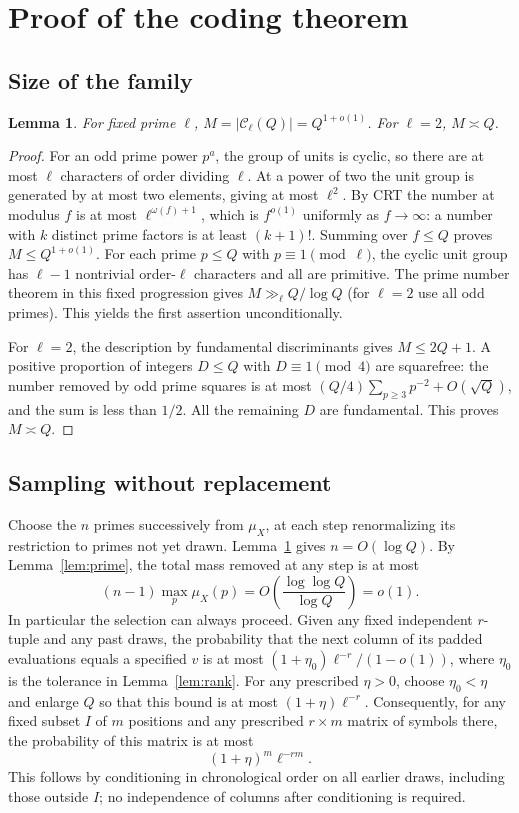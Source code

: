 \documentclass[11pt]{article}
\newtheorem{lemma}[theorem]{Lemma}
\theoremstyle{remark}\newtheorem{remark}[theorem]{Remark}
\newcommand{\C}{\mathcal C}
\newcommand{\abs}[1]{\left|#1\right|}
\begin{document}
\section{Proof of the coding theorem}
\subsection{Size of the family}
\begin{lemma}\label{lem:count}
For fixed prime $\ell$, $M=\abs{\C_\ell(Q)}=Q^{1+o(1)}$. For $\ell=2$, $M\asymp Q$.
\end{lemma}
\begin{proof}
For an odd prime power $p^a$, the group of units is cyclic, so there are at most $\ell$ characters of order dividing $\ell$. At a power of two the unit group is generated by at most two elements, giving at most $\ell^2$. By CRT the number at modulus $f$ is at most $\ell^{\omega(f)+1}$, which is $f^{o(1)}$ uniformly as $f\to\infty$: a number with $k$ distinct prime factors is at least $(k+1)!$. Summing over $f\le Q$ proves $M\le Q^{1+o(1)}$. For each prime $p\le Q$ with $p\equiv1\pmod\ell$, the cyclic unit group has $\ell-1$ nontrivial order-$\ell$ characters and all are primitive. The prime number theorem in this fixed progression gives $M\gg_\ell Q/\log Q$ (for $\ell=2$ use all odd primes). This yields the first assertion unconditionally.

For $\ell=2$, the description by fundamental discriminants gives $M\le2Q+1$. A positive proportion of integers $D\le Q$ with $D\equiv1\pmod4$ are squarefree: the number removed by odd prime squares is at most $(Q/4)\sum_{p\ge3}p^{-2}+O(\sqrt Q)$, and the sum is less than $1/2$. All the remaining $D$ are fundamental. This proves $M\asymp Q$.
\end{proof}

\subsection{Sampling without replacement}
Choose the $n$ primes successively from $\mu_X$, at each step renormalizing its restriction to primes not yet drawn. Lemma~\ref{lem:count} gives $n=O(\log Q)$. By Lemma~\ref{lem:prime}, the total mass removed at any step is at most
\[
 (n-1)\max_p\mu_X(p)=O\left(\frac{\log\log Q}{\log Q}\right)=o(1).
\]
In particular the selection can always proceed. Given any fixed independent $r$-tuple and any past draws, the probability that the next column of its padded evaluations equals a specified $v$ is at most $(1+\eta_0)\ell^{-r}/(1-o(1))$, where $\eta_0$ is the tolerance in Lemma~\ref{lem:rank}. For any prescribed $\eta>0$, choose $\eta_0<\eta$ and enlarge $Q$ so that this bound is at most $(1+\eta)\ell^{-r}$. Consequently, for any fixed subset $I$ of $m$ positions and any prescribed $r\times m$ matrix of symbols there, the probability of this matrix is at most
\begin{equation}\label{eq:matrix}
 (1+\eta)^m\ell^{-rm}.
\end{equation}
This follows by conditioning in chronological order on all earlier draws, including those outside $I$; no independence of columns after conditioning is required.
\end{document}
